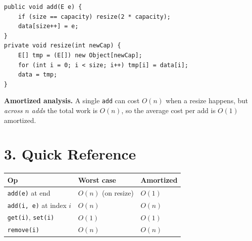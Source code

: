 \documentclass[11pt]{article}
\begin{document}
\begin{lstlisting}
public void add(E e) {
    if (size == capacity) resize(2 * capacity);
    data[size++] = e;
}
private void resize(int newCap) {
    E[] tmp = (E[]) new Object[newCap];
    for (int i = 0; i < size; i++) tmp[i] = data[i];
    data = tmp;
}
\end{lstlisting}

\textbf{Amortized analysis.} A single \texttt{add} can cost $O(n)$ when a resize happens, but \emph{across $n$ adds} the total work is $O(n)$, so the average cost per add is $O(1)$ amortized.

\section*{3. Quick Reference}

\begin{center}
\begin{tabular}{lll}
\textbf{Op} & \textbf{Worst case} & \textbf{Amortized} \\
\hline
\texttt{add(e)} at end          & $O(n)$ (on resize) & $O(1)$ \\
\texttt{add(i, e)} at index $i$ & $O(n)$ & $O(n)$ \\
\texttt{get(i)}, \texttt{set(i)}& $O(1)$ & $O(1)$ \\
\texttt{remove(i)}              & $O(n)$ & $O(n)$ \\
\end{tabular}
\end{center}
\end{document}
